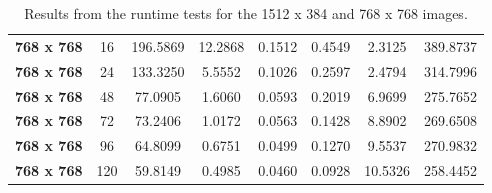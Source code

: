 \documentclass[11pt, a4paper]{article}
\begin{document}
\begin{table}
\begin{tabular}{|c|c|c|c|c|c|c|c|}
				\textbf{768 x 768} & 16    & 196.5869 & 12.2868 & 0.1512 & 0.4549 & 2.3125 & 389.8737 \\
				\textbf{768 x 768} & 24    & 133.3250 & 5.5552 & 0.1026 & 0.2597 & 2.4794 & 314.7996 \\
				\textbf{768 x 768} & 48    & 77.0905 & 1.6060 & 0.0593 & 0.2019 & 6.9699 & 275.7652 \\
				\textbf{768 x 768} & 72    & 73.2406 & 1.0172 & 0.0563 & 0.1428 & 8.8902 & 269.6508 \\
				\textbf{768 x 768} & 96    & 64.8099 & 0.6751 & 0.0499 & 0.1270 & 9.5537 & 270.9832 \\
				\textbf{768 x 768} & 120   & 59.8149 & 0.4985 & 0.0460 & 0.0928 & 10.5326 & 258.4452 \\
				\hline
			\end{tabular}
		\caption{Results from the runtime tests for the 1512 x 384 and 768 x 768 images.}
		\label{tab:all_data}
	\end{table}
		
\end{document}
